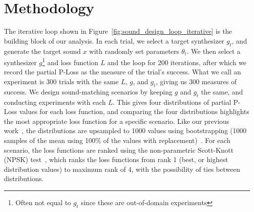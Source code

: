 \documentclass{article} %
\providecommand{\gls}[1]{#1}
\begin{document}


\section{Methodology}
\label{sec:experiment_setup}
The iterative loop shown in Figure~\ref{fig:sound_design_loop_iterative} is the building block of our analysis. In each trial, we select a target synthesizer $g_t$, and generate the target sound $x$ with randomly set parameters $\theta_t$. We then select a synthesizer $g$\footnote{Often not equal to $g_t$ since these are out-of-domain experiments} and loss function $L$ and the loop for 200 iterations, after which we record the partial P-Loss as the measure of the trial's success. What we call an experiment is 300 trials with the same $L$, $g$, and $g_t$, giving us 300 measures of success. We design sound-matching scenarios by keeping $g$ and $g_t$ the same, and conducting experiments with each $L$. This gives four distributions of partial P-Loss values for each loss function, and comparing the four distributions highlights the most appropriate loss function for a specific scenario. Like our previous work~\cite{salimi2025soundmatching}, the distributions are upsampled to 1000 values using bootstrapping (1000 samples of the mean using 100\% of the values with replacement)~\cite{tibshirani1993introduction,chernick2011bootstrap}. For each scenario, the loss functions are ranked using the non-parametric Scott-Knott (\gls{NPSK}) test~\cite{tantithamthavorn2017mvt,tantithamthavorn2018optimization}, which ranks the loss functions from rank 1 (best, or highest distribution values) to maximum rank of 4, with the possibility of ties between distributions. 
\end{document}

